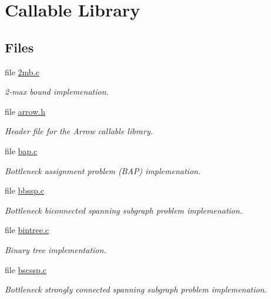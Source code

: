 \hypertarget{group__lib}{
\section{Callable Library}
\label{group__lib}
}
\subsection*{Files}
\begin{CompactItemize}
\item 
file \hyperlink{lib_22mb_8c}{2mb.c}
\begin{CompactList}\small\item\em 2-max bound implemenation. \item\end{CompactList}

\item 
file \hyperlink{arrow_8h}{arrow.h}
\begin{CompactList}\small\item\em Header file for the Arrow callable library. \item\end{CompactList}

\item 
file \hyperlink{lib_2bap_8c}{bap.c}
\begin{CompactList}\small\item\em Bottleneck assignment problem (BAP) implemenation. \item\end{CompactList}

\item 
file \hyperlink{lib_2bbssp_8c}{bbssp.c}
\begin{CompactList}\small\item\em Bottleneck biconnected spanning subgraph problem implemenation. \item\end{CompactList}

\item 
file \hyperlink{bintree_8c}{bintree.c}
\begin{CompactList}\small\item\em Binary tree implementation. \item\end{CompactList}

\item 
file \hyperlink{lib_2bscssp_8c}{bscssp.c}
\begin{CompactList}\small\item\em Bottleneck strongly connected spanning subgraph problem implemenation. \item\end{CompactList}


\end{CompactItemize}
